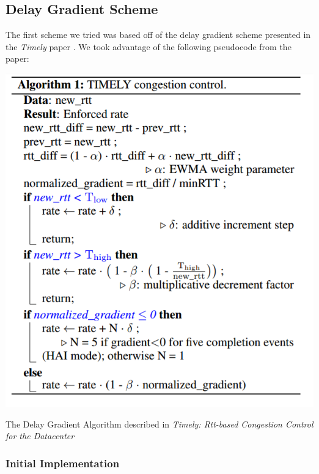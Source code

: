\documentclass[11pt,a4paper]{article}
\begin{document}
\subsection{Delay Gradient Scheme}
The first scheme we tried was based off of the delay gradient scheme presented
in the \textit{Timely} paper \cite{mittal2015timely}.  We took advantage of the
following pseudocode from the paper:

\begin{algorithm}
  \includegraphics[scale=0.54]{Timely_pseudocode}
  \caption{The Delay Gradient Algorithm described in \textit{Timely: Rtt-based
  Congestion Control for the Datacenter} \cite{mittal2015timely}}
  \label{alg}
\end{algorithm}

\subsubsection{Initial Implementation}
\end{document}
